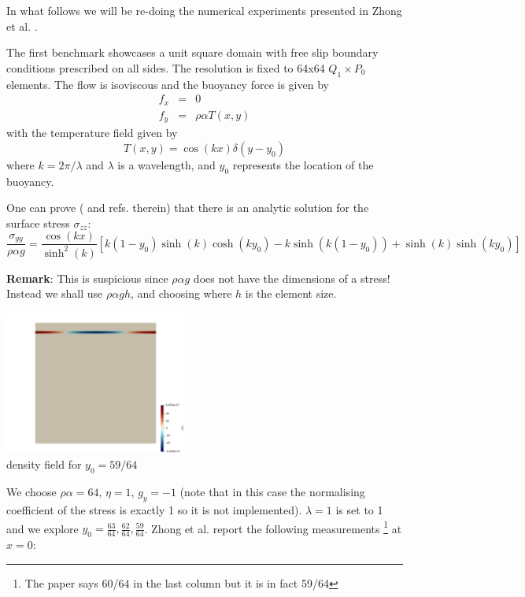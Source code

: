 In what follows we will be re-doing the numerical experiments presented in 
Zhong et al. \cite{zhgh93}.

The first benchmark showcases a unit square domain with free slip 
boundary conditions prescribed on all sides.
The resolution is fixed to 64x64 $Q_1 \times P_0$ elements. 
The flow is isoviscous and the buoyancy force is given by 
\begin{eqnarray}
f_x &=& 0 \nonumber\\
f_y &=& \rho \alpha T(x,y) \nonumber
\end{eqnarray}
with the temperature field given by 
\[
T(x,y) = \cos(kx) \delta(y-y_0)
\]
where $k=2\pi/\lambda$ and $\lambda$ is a wavelength, 
and $y_0$ represents the location of the buoyancy.

One can prove (\cite{zhgh93} and refs. therein) that 
there is an analytic solution for the surface stress $\sigma_{zz}$:
\[
\frac{\sigma_{yy}}{\rho \alpha g} =
\frac{\cos (kx)}{\sinh^2(k)}
\left[
k(1-y_0)\sinh(k) \cosh(ky_0)-k \sinh(k(1-y_0))
+\sinh(k) \sinh(ky_0)
\right]
\]

{\bf Remark}: This is suspicious since $\rho \alpha g$ does not have the 
dimensions of a stress! Instead we shall use $\rho \alpha g h$, and choosing 
where $h$ is the element size.

\begin{center}
\includegraphics[width=6cm]{python_codes/fieldstone_27/rho}\\
density field for $y_0=59/64$
\end{center}

We choose $\rho \alpha = 64$, $\eta=1$, $g_y=-1$ (note that in this case the 
normalising coefficient of the stress is exactly 1 so it is not implemented).
$\lambda=1$ is set to 1 and we explore $y_0 = \frac{63}{64},\frac{62}{64},\frac{59}{64}$.
Zhong et al. report the following measurements
\footnote{The paper says 60/64 in the last column but it is in fact 59/64}
 at $x=0$:

